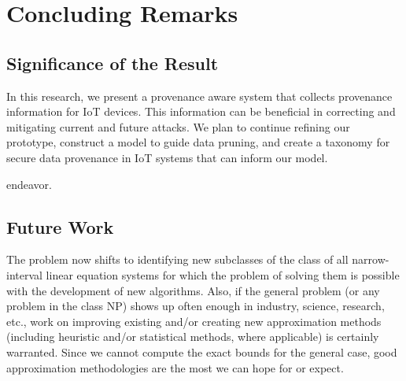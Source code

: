 
\chapter{Concluding Remarks}

\section{Significance of the Result}

In this research, we present a provenance aware system that collects provenance information for IoT devices. This information can be beneficial in correcting and mitigating current and future attacks. We plan to continue refining our prototype, construct a model to guide data pruning, and create a taxonomy for secure data provenance in IoT systems that can inform our model.

endeavor.

\section{Future Work}

The problem now shifts to identifying new subclasses of the class of all
narrow-interval linear equation systems for which the problem of solving them
is possible with the development of new algorithms.  Also, if the general
problem (or any problem in the class NP) shows up often enough in industry,
science, research, etc., work on improving existing and/or creating new
approximation methods (including heuristic and/or statistical methods, where
applicable) is certainly warranted.  Since we cannot compute the exact bounds
for the general case, good approximation methodologies are the most we can
hope for or expect.
